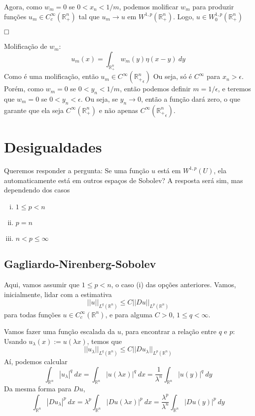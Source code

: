 \documentclass[a4paper, 11pt]{article}
\newcommand{\qed}{$\hfill\square$}
\newcommand{\R}{\mathbb{R}}
\newcommand{\Rn}{{\mathbb{R}^n}}
\newcommand{\e}{\epsilon}
\newcommand{\nor}[2]{||#1||_{#2}}
\begin{document}
Agora, como $ w_m=0 $ se $ 0 < x_n < 1/m $, podemos molificar $ w_m $ para produzir funções $ u_m \in C^\infty_c(\R^n_+) $ tal que $ u_m \rightarrow u \text{ em } W^{1,p}(\R^n_+)$. Logo, $ u \in W^{1,p}_0 (\R^n_+) $

\qed

Molificação de $w_m$: \[ u_m(x) = \int_{\R^n_+} w_m(y) \eta(x-y)\ dy \] Como é uma molificação, então $u_m \in C^\infty({\R^n_+}_\e)$ Ou seja, só é $C^\infty$ para $x_n> \e$. Porém, como $w_m=0$ se $0 < y_n < 1/m$, então podemos definir $m=1/\e$, e teremos que $w_m=0$ se $0 < y_n < \e$. Ou seja, se $y_n \rightarrow 0$, então a função dará zero, o que garante que ela seja $C^\infty({\R^n_+})$ e não apenas $C^\infty({\R^n_+}_\e)$.



\section{Desigualdades}

Queremos responder a pergunta: Se uma função $ u $ está em $ W^{1,p}(U) $, ela automaticamente está em outros espaços de Sobolev? A resposta será sim, mas dependendo dos casos \begin{enumerate}[(i)]
	\item $ 1 \leq p < n $
	\item $ p = n $
	\item $ n < p \leq \infty $
\end{enumerate}

\subsection{Gagliardo-Nirenberg-Sobolev}

Aqui, vamos assumir que $ 1 \leq p < n $, o caso (i) das opções anteriores. Vamos, inicialmente, lidar com a estimativa \[ \nor{u}{L^q(\Rn)} \leq C \nor{Du}{L^p(\Rn)}\] para todas funções $ u \in C^\infty_c(\Rn) $, e para alguma $ C>0 $, $ 1 \leq q < \infty $.

Vamos fazer uma função escalada da $ u $, para encontrar a relação entre $ q $ e $ p $: Usando $ u_{\lambda}(x):=u(\lambda x) $, temos que \[ \nor{u_{\lambda}}{L^q(\Rn)} \leq C \nor{Du_\lambda}{L^p(\Rn)}\] Aí, podemos calcular \[ \int_\Rn |u_{\lambda}|^q\ dx =  \int_\Rn |u(\lambda x)|^q\ dx = \frac{1}{\lambda^n} \int_\Rn |u(y)|^q\ dy\] Da mesma forma para $ Du $, \[ \int_\Rn |Du_{\lambda}|^p\ dx =  \lambda^p \int_\Rn |Du(\lambda x)|^p\ dx = \frac{\lambda^p}{\lambda^n} \int_\Rn |Du(y)|^p\ dy\]
\end{document}
